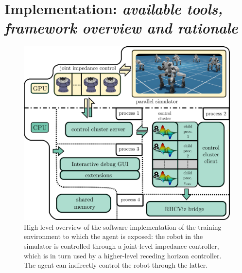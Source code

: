 \section{Implementation: \textnormal{\textit{available tools, framework overview and rationale}}}
\begin{figure}[t]
	\centering
	\includegraphics[width=0.9\columnwidth]{imgs/cocluster_arch.pdf}
	\caption{High-level overview of the software implementation of the training environment to which the agent is exposed: the robot in the simulator is controlled through a joint-level impedance controller, which is in turn used by a higher-level receding horizon controller. The agent can indirectly control the robot through the latter.}
	\label{fig:coclbridge_arch}
\end{figure}
\cite{rl:mujocoaccelereted2023}
\cite{frameworks:mittal2023orbit}

